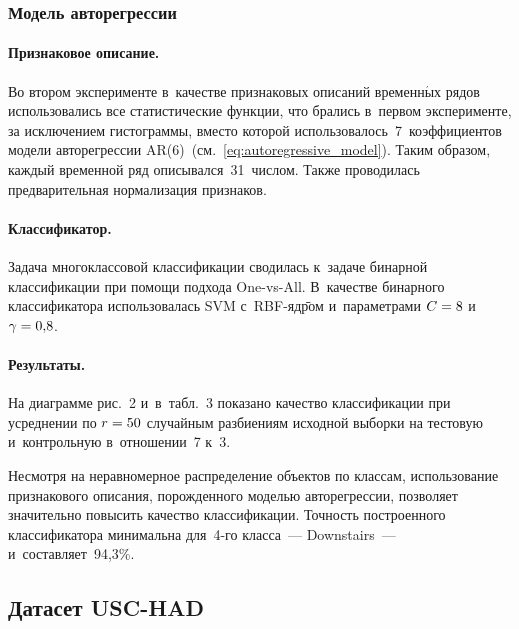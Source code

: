 \begin{multicols}{2}


\subsubsection{Модель авторегрессии} %

\paragraph*{Признаковое описание.}
Во втором эксперименте в~качестве признаковых описаний временн$\acute{\mbox{ы}}$х 
рядов использовались все статистические функции, что брались в~первом эксперименте, 
за исключением гистограммы, вместо которой использовалось~7~коэффициентов 
модели авторегрессии AR($6$)~(см.~\eqref{eq:autoregressive_model}).
Таким образом, каждый временной ряд описывался~31~числом.
Также проводилась предварительная нормализация признаков.

\vspace*{-6pt}

\paragraph*{Классификатор.}
Задача многоклассовой классификации сводилась к~задаче 
бинарной классификации при помощи подхода One-vs-All.
В~качестве бинарного классификатора использовалась SVM с~RBF-яд\=ром 
и~параметрами $C\hm=8$ и~$\gamma\hm=0{,}8$.

\vspace*{-6pt}

\paragraph*{Результаты.}
На диаграмме рис.~2 и~в~табл.~3 показано качество классификации при усреднении по
$r\hm=50$ случайным разбиениям исходной выборки на тестовую и~контрольную 
в~отношении~7 к~3.




Несмотря на неравномерное распределение объектов по классам, 
использование признакового описания, порожденного моделью авторегрессии, 
позволяет значительно повысить качество классификации.
Точность построенного классификатора минимальна для~4-го класса~--- Downstairs~--- 
и~со\-став\-ля\-ет~94,3\%.

\subsection{Датасет USC-HAD}


\end{multicols}
